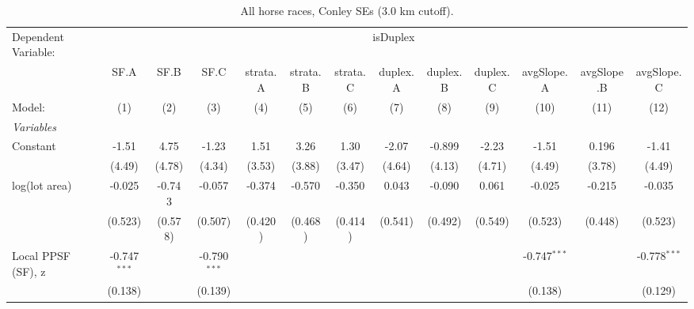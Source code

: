 
\begin{table}[htbp]
   \caption{\label{tab:horseRace_combined_conley} All horse races, Conley SEs (3.0 km cutoff).}
   \centering
   \begin{tabular}{lcccccccccccc}
      \tabularnewline \midrule \midrule
      Dependent Variable: & \multicolumn{12}{c}{isDuplex}\\
                                         & SF.A           & SF.B    & SF.C           & strata.A       & strata.B      & strata.C       & duplex.A       & duplex.B       & duplex.C       & avgSlope.A     & avgSlope.B     & avgSlope.C \\   
      Model:                             & (1)            & (2)     & (3)            & (4)            & (5)           & (6)            & (7)            & (8)            & (9)            & (10)           & (11)           & (12)\\  
      \midrule
      \emph{Variables}\\
      Constant                           & -1.51          & 4.75    & -1.23          & 1.51           & 3.26          & 1.30           & -2.07          & -0.899         & -2.23          & -1.51          & 0.196          & -1.41\\   
                                         & (4.49)         & (4.78)  & (4.34)         & (3.53)         & (3.88)        & (3.47)         & (4.64)         & (4.13)         & (4.71)         & (4.49)         & (3.78)         & (4.49)\\   
      log(lot area)                      & -0.025         & -0.743  & -0.057         & -0.374         & -0.570        & -0.350         & 0.043          & -0.090         & 0.061          & -0.025         & -0.215         & -0.035\\   
                                         & (0.523)        & (0.578) & (0.507)        & (0.420)        & (0.468)       & (0.414)        & (0.541)        & (0.492)        & (0.549)        & (0.523)        & (0.448)        & (0.523)\\   
      Local PPSF (SF), z                 & -0.747$^{***}$ &         & -0.790$^{***}$ &                &               &                &                &                &                & -0.747$^{***}$ &                & -0.778$^{***}$\\   
                                         & (0.138)        &         & (0.139)        &                &               &                &                &                &                & (0.138)        &                & (0.129)\\   

\end{tabular}
\end{table}
